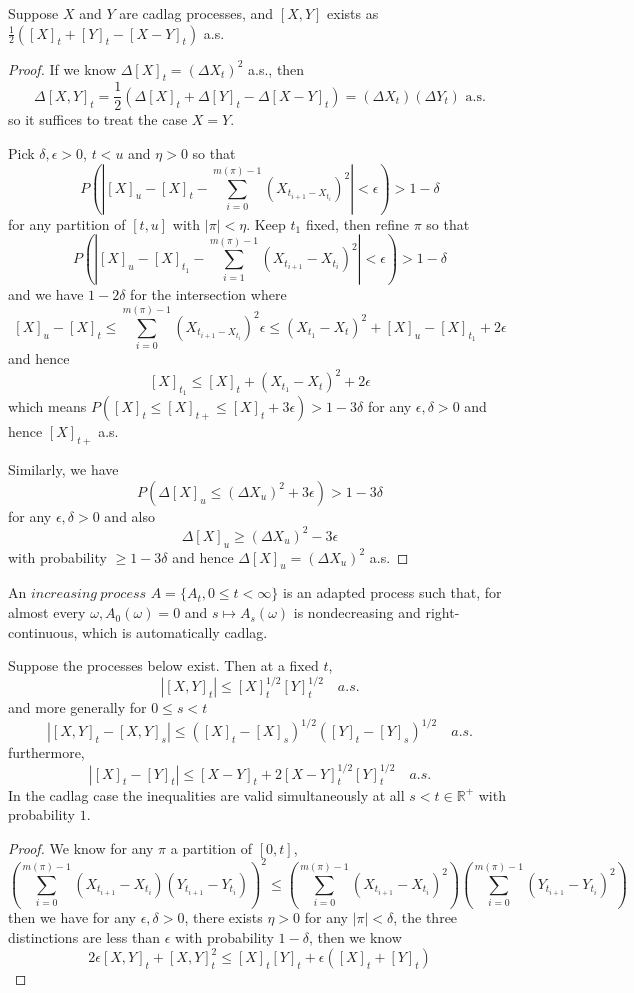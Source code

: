 \documentclass[lang=en, color=blue, ]{elegantbook}
\newcommand{\R}{\mathbb{R}}
\begin{document}
\begin{proposition}
    Suppose $X$ and $Y$ are cadlag processes, and $[X,Y]$ exists as $\tfrac{1}{2}([X]_t+[Y]_t-[X-Y]_t)$ a.s.\par
\end{proposition}
\begin{proof}
    If we know $\Delta [X]_t = (\Delta X_t)^2$ a.s., then
    \[\Delta [X,Y]_t = \dfrac{1}{2}(\Delta [X]_t+\Delta[Y]_t-\Delta[X-Y]_t) = (\Delta X_t)(\Delta Y_t)\text{ a.s.}\]
    so it suffices to treat the case $X=Y$.\par
    Pick $\delta,\epsilon > 0$, $t<u$ and $\eta > 0$ so that
    \[P(|[X]_u-[X]_t-\sum\limits_{i=0}^{m(\pi)-1} (X_{t_{i+1}- X_{t_i}})^2|<\epsilon) > 1-\delta\]
    for any partition of $[t,u]$ with $|\pi|<\eta$. Keep $t_1$ fixed, then refine $\pi$ so that
    \[P(|[X]_u-[X]_{t_1}-\sum\limits_{i=1}^{m(\pi)-1}(X_{t_{i+1}}-X_{t_i})^2|<\epsilon) > 1-\delta\]
    and we have $1-2\delta$ for the intersection where
    \[[X]_u-[X]_t \leq \sum\limits_{i=0}^{m(\pi)-1} (X_{t_{i+1}-X_{t_i}})^2 \epsilon  \leq (X_{t_1}-X_t)^2+[X]_u-[X]_{t_1}+2\epsilon\]
    and hence
    \[[X]_{t_1} \leq [X]_t + (X_{t_1}-X_t)^2 + 2\epsilon\]
    which means $P([X]_t \leq [X]_{t+} \leq [X]_t + 3\epsilon) > 1-3\delta$ for any $\epsilon ,\delta > 0$ and hence $[X]_{t+}$ a.s.\par
    Similarly, we have
    \[P(\Delta [X]_u \leq (\Delta X_u)^2 + 3\epsilon) > 1-3\delta\]
    for any $\epsilon,\delta > 0$ and also
    \[\Delta [X]_u \geq (\Delta X_u)^2 - 3\epsilon\]
    with probability $\geq 1-3\delta$ and hence $\Delta [X]_u = (\Delta X_u)^2$ a.s.
\end{proof}

\begin{definition}
    An $increasing\ process$ $A = \{A_t, 0 \leq t < \infty\}$ is an adapted process such that, for almost every $\omega, A_0(\omega) = 0$ and $s\mapsto A_s(\omega)$ is nondecreasing and right-continuous, which is automatically cadlag.
\end{definition}

\begin{lemma}
    Suppose the processes below exist. Then at a fixed $t$,
    \[|[X,Y]_t| \leq [X]_t^{1/2}[Y]_t^{1/2}\quad a.s.\]
    and more generally for $0 \leq s < t$
    \[|[X,Y]_t-[X,Y]_s| \leq ([X]_t-[X]_s)^{1/2}([Y]_t-[Y]_s)^{1/2}\quad a.s.\]
    furthermore,
    \[|[X]_t-[Y]_t| \leq [X-Y]_t + 2[X-Y]_t^{1/2}[Y]_t^{1/2}\quad a.s.\]
    In the cadlag case the inequalities are valid simultaneously at all $s < t\in\R^+$ with probability $1$.
\end{lemma}
\begin{proof}
    We know for any $\pi$ a partition of $[0,t]$,
    \[(\sum\limits_{i=0}^{m(\pi)-1} (X_{t_{i+1}}-X_{t_i})(Y_{t_{i+1}}-Y_{t_i}))^2 \leq (\sum\limits_{i=0}^{m(\pi)-1} (X_{t_{i+1}}-X_{t_i})^2)(\sum\limits_{i=0}^{m(\pi)-1} (Y_{t_{i+1}}-Y_{t_i})^2)\]
    then we have for any $\epsilon, \delta > 0$, there exists $\eta > 0$ for any $|\pi| < \delta$, the three distinctions are less than $\epsilon$ with probability $1-\delta$, then we know
    \[2\epsilon[X,Y]_t + [X,Y]_t^2 \leq [X]_t[Y]_t + \epsilon([X]_t+[Y]_t)\]

\end{proof}
\end{document}
